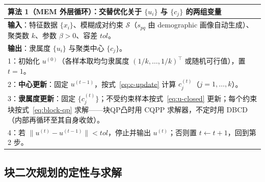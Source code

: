 \documentclass[11pt,a4paper]{ctexart}
\begin{document}
	\begin{table}[H]
		\centering
		\small
		\begin{tabular}{p{13.5cm}}
			\toprule
			\textbf{算法 1（MEM 外层循环）}：交替优化关于 $\{u_i\}$ 与 $\{c_j\}$ 的两组变量 \\
			\midrule
			\textbf{输入}：特征数据 $\{x_i\}$、模糊成对约束 $\mathcal{S}$（$s_{pq}$ 由 demographic 画像自动生成）、聚类数 $k$、参数 $\beta>0$、容差 $tol$。\\
			\textbf{输出}：隶属度 $\{u_i\}$ 与聚类中心 $\{c_j\}$。\\
			1：初始化 $u^{(0)}$（各样本取均匀隶属度 $(1/k,\ldots,1/k)^{\top}$ 或随机可行值），置 $t=1$。\\
			2：\textbf{中心更新}：固定 $u^{(t-1)}$，按式~\eqref{eq:c-update} 计算 $c_j^{(t)}$（$j=1,\ldots,k$）。\\
			3：\textbf{隶属度更新}：固定 $\{c_j^{(t)}\}$；不受约束样本按式~\eqref{eq:u-closed} 更新；每个约束块按式~\eqref{eq:block-qp} 求解——块QP凸时用 CQPP 求解器，不定时用 DBCD（内部再循环至其自身收敛）。\\
			4：若 $\|u^{(t)} - u^{(t-1)}\| < tol$，停止并输出 $u^{(t)}$；否则置 $t \leftarrow t+1$，回到第 2 步。\\
			\bottomrule
		\end{tabular}
	\end{table}
	
	\subsection{块二次规划的定性与求解}\label{subsec:solver}
	
\end{document}
